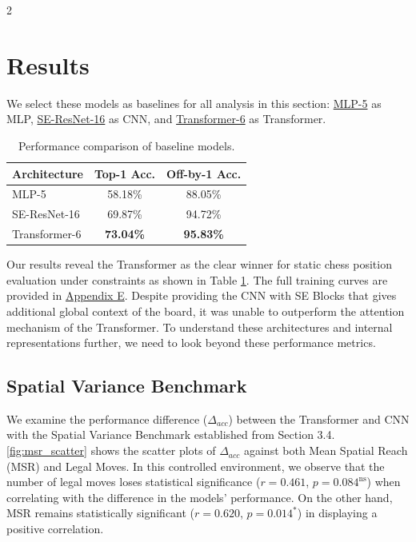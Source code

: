 \documentclass[a4paper,10pt]{article}
\begin{document}
\begin{multicols*}{2}
\section{Results}
\label{sec:results}
We select these models as baselines for all analysis in this section: \hyperref[mlp_details]{MLP-5} as MLP, \hyperref[cnn_details]{SE-ResNet-16} as CNN, and \hyperref[transformer_details]{Transformer-6} as Transformer.
\begin{table}[H] %
    \centering
    \caption{Performance comparison of baseline models.}
    \label{tab:main_results}
    \begin{tabular}{@{}lcc@{}}
    \toprule
    \textbf{Architecture} & \textbf{Top-1 Acc.} & \textbf{Off-by-1 Acc.} \\ \midrule
    MLP-5 & 58.18\% & 88.05\%  \\
    SE-ResNet-16 & 69.87\% & 94.72\% \\
    Transformer-6 & \textbf{73.04\%} & \textbf{95.83\%} \\ \bottomrule
    \end{tabular}%
    \vspace{-1em}
\end{table}

Our results reveal the Transformer as the clear winner for static chess position evaluation under constraints as shown in Table \ref{tab:main_results}. The full training curves are provided in \hyperref[sec:training_curves]{Appendix E}. Despite providing the CNN with SE Blocks that gives additional global context of the board, it was unable to outperform the attention mechanism of the Transformer. To understand these architectures and internal representations further, we need to look beyond these performance metrics. 

\subsection{Spatial Variance Benchmark}
We examine the performance difference ($\Delta_{acc}$) between the Transformer and CNN with the Spatial Variance Benchmark established from Section 3.4. \autoref{fig:msr_scatter} shows the scatter plots of $\Delta_{acc}$ against both Mean Spatial Reach (MSR) and Legal Moves. In this controlled environment, we observe that the number of legal moves loses statistical significance ($r = 0.461$, $p = 0.084^{\text{ns}}$) when correlating with the difference in the models' performance. On the other hand, MSR remains statistically significant ($r = 0.620$, $p = 0.014^{*}$) in displaying a positive correlation.


\end{multicols*}
\end{document}
